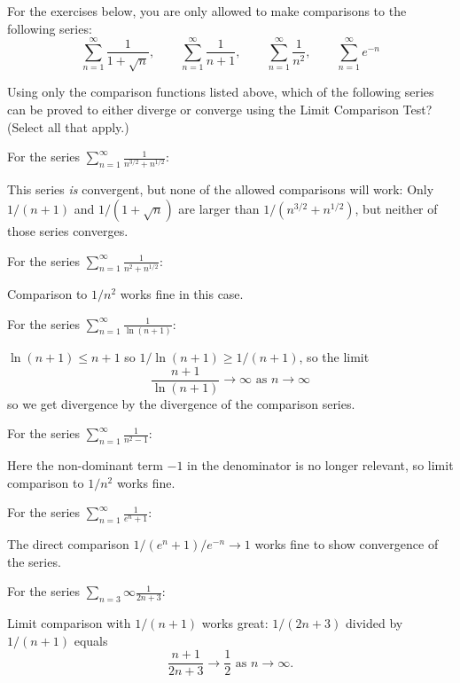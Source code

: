 \documentclass{ximera}
\begin{document}
For the exercises below, you are only allowed to make comparisons to the following series:
\[ \sum_{n=1}^\infty \frac{1}{1+\sqrt{n}}, \qquad \sum_{n=1}^\infty \frac{1}{n+1},  \qquad \sum_{n=1}^\infty \frac{1}{n^2}, \qquad \sum_{n=1}^\infty e^{-n} \]
\begin{exercise}
Using only the comparison functions listed above, which of the following series can be proved to either diverge or converge using the Limit Comparison Test? (Select all that apply.)
\begin{selectAll}
\end{selectAll}
\begin{feedback}
For the series {$\displaystyle \sum_{n=1}^\infty \frac{1}{n^{3/2}+n^{1/2}}$}:
\begin{expandable}
This series \textit{is} convergent, but none of the allowed comparisons will work: Only $1/(n+1)$ and $1/(1+\sqrt{n})$ are larger than $1/(n^{3/2}+n^{1/2})$, but neither of those series converges.
\end{expandable}

For the series {$\displaystyle \sum_{n=1}^\infty \frac{1}{n^2 + n^{1/2}}$}:
\begin{expandable}
Comparison to $1/n^2$ works fine in this case.
\end{expandable}

For the series {$\displaystyle \sum_{n=1}^\infty \frac{1}{\ln (n+1)}$}:
\begin{expandable}
$\ln (n+1) \leq n+1$ so $1/\ln (n+1) \geq 1/(n+1)$, so the limit
\[ \frac{n+1}{\ln (n+1)} \rightarrow \infty \text{ as } n \rightarrow \infty \]
so we get divergence by the divergence of the comparison series.
\end{expandable}

For the series {$\displaystyle \sum_{n=1}^\infty \frac{1}{n^2-1}$}:
\begin{expandable}
Here the non-dominant term $-1$ in the denominator is no longer relevant, so limit comparison to $1/n^2$ works fine.
\end{expandable}

For the series {$\displaystyle \sum_{n=1}^\infty \frac{1}{e^n  + 1}$}:
\begin{expandable}
The direct comparison $1/(e^n + 1) / e^{-n} \rightarrow 1$ works fine to show convergence of the series.
\end{expandable}

For the series {$\displaystyle \sum_{n=3}{\infty} \frac{1}{2n+3}$}:
\begin{expandable}
Limit comparison with $1/(n+1)$ works great: $1/(2n+3)$ divided by $1/(n+1)$ equals
\[ \frac{n+1}{2n+3} \rightarrow \frac{1}{2} \text{ as } n \rightarrow \infty. \]
\end{expandable}

\end{feedback}
\end{exercise}
\end{document}
